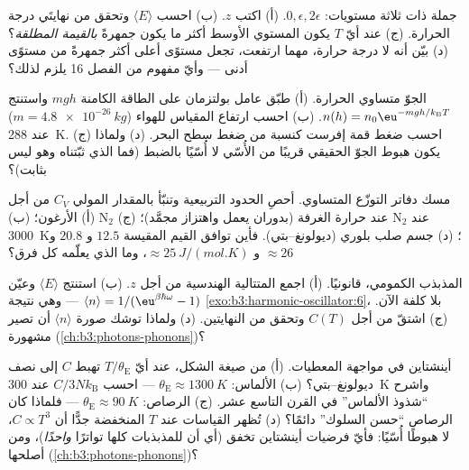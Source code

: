 \begin{exercise}[$\star$]\label{exo:b3:canonical-ensemble:2}
جملة ذات ثلاثة مستويات: $0, \epsilon, 2\epsilon$. (أ) اكتب $z$. (ب)
احسب $\langle E\rangle$ وتحقق من نهايتَي درجة الحرارة. (ج)
عند أيّ $T$ يكون المستوي الأوسط أكثر ما يكون جمهرةً \emph{بالقيمة
المطلقة}؟ (د) بيّن أنه لا درجة حرارة، مهما ارتفعت، تجعل
مستوًى أعلى أكثر جمهرةً من مستوًى أدنى --- وأيّ مفهوم من الفصل 16 يلزم لذلك؟
\end{exercise}

\begin{exercise}[$\star$]\label{exo:b3:canonical-ensemble:3}
الجوّ متساوي الحرارة. (أ) طبّق عامل بولتزمان على
الطاقة الكامنة $mgh$ واستنتج $n(h) = n_0\eu^{-mgh/k_{\text{B}}
T}$. (ب) احسب ارتفاع المقياس للهواء ($m = \qty{4.8e-26}{kg}$)
عند \qty{288}{K}. (ج) احسب ضغط قمة إفرست كنسبة من ضغط سطح
البحر. (د) ولماذا يكون هبوط الجوّ الحقيقي قريبًا من الأُسّي لا
أُسّيًا بالضبط (فما الذي ثبّتناه وهو ليس بثابت)؟
\end{exercise}

\begin{exercise}[$\star$]\label{exo:b3:canonical-ensemble:4}
مسك دفاتر التوزّع المتساوي. أحصِ الحدود التربيعية وتنبّأ
بالمقدار المولي $C_V$ من أجل (أ) الأرغون؛ (ب) N$_2$ عند حرارة الغرفة
(بدوران يعمل واهتزاز مجمَّد)؛ (ج) N$_2$ عند \qty{3000}{K}؛ (د)
جسم صلب بلوري (ديولونغ--بتي). فأين توافق القيم المقيسة
$12.5$ و $20.8$ و $\approx26$ و $\approx\qty{25}{J/(mol.K)}$،
وما الذي يعلّمه كل فرق؟
\end{exercise}

\begin{exercise}[$\star\star$]\label{exo:b3:canonical-ensemble:5}
المذبذب الكمومي، قانونيًا. (أ) اجمع المتتالية الهندسية
من أجل $z$. (ب) استنتج $\langle E\rangle$ وعيّن $\langle
n\rangle = 1/(\eu^{\beta\hbar\omega} - 1)$ --- وهي نتيجة
\cref{exo:b3:harmonic-oscillator:6}، بلا كلفة الآن. (ج)
اشتقّ من أجل $C(T)$ وتحقق من النهايتين. (د) ولماذا توشك صورة
$\langle n\rangle$ أن تصير مشهورة
(\cref{ch:b3:photons-phonons})؟
\end{exercise}

\begin{exercise}[$\star\star$]\label{exo:b3:canonical-ensemble:6}
أينشتاين في مواجهة المعطيات. (أ) من صيغة الشكل، عند أيّ
$T/\theta_{\text{E}}$ تهبط $C$ إلى نصف ديولونغ--بتي؟ (ب)
الألماس: $\theta_{\text{E}} \approx \qty{1300}{K}$ --- احسب
$C/3Nk_{\text{B}}$ عند \qty{300}{K} واشرح ``شذوذ الألماس'' في
القرن التاسع عشر. (ج) الرصاص: $\theta_{\text{E}}
\approx \qty{90}{K}$ --- فلماذا كان الرصاص ``حسن السلوك'' دائمًا؟ (د)
تُظهر القياسات عند $T$ المنخفضة جدًّا أن $C \propto T^3$، لا
هبوطًا أُسّيًا: فأيّ فرضيات أينشتاين تخفق (أي أن للمذبذبات كلها
تواترًا \emph{واحدًا})، ومن أصلحها
(\cref{ch:b3:photons-phonons})؟
\end{exercise}


